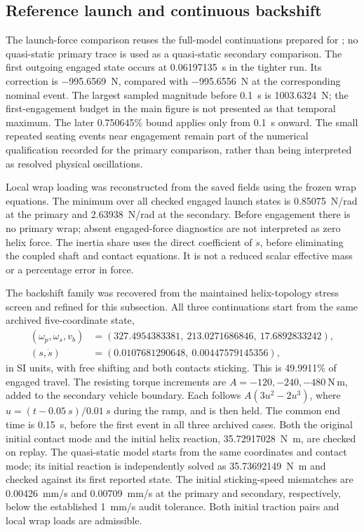 \documentclass[11pt]{report}
\numberwithin{equation}{section}
\begin{document}
\subsection{Reference launch and continuous backshift}

The launch-force comparison reuses the full-model continuations prepared for
; no quasi-static primary trace
is used as a quasi-static secondary comparison. The first outgoing engaged
state occurs at \SI{0.06197135}{s} in the tighter run. Its correction is
\SI{-995.6569}{N}, compared with \SI{-995.6556}{N} at the corresponding
nominal event. The largest sampled magnitude before \SI{0.1}{s} is
\SI{1003.6324}{N}; the first-engagement budget in the main figure is not
presented as that temporal maximum. The later \num{0.750645}\% bound
applies only from \SI{0.1}{s} onward. The small repeated seating events
near engagement remain part of the numerical qualification recorded for
the primary comparison, rather than being interpreted as resolved physical
oscillations.

Local wrap loading was reconstructed from the saved fields using the
frozen wrap equations. The minimum over all checked engaged launch states
is \SI{0.85075}{N/rad} at the primary and \SI{2.63938}{N/rad} at the
secondary. Before engagement there is no primary wrap; absent engaged-force
diagnostics are not interpreted as zero helix force. The inertia share
uses the direct coefficient of \(\ddot s\), before eliminating the
coupled shaft and contact equations. It is not a reduced scalar effective
mass or a percentage error in force.

The backshift family was recovered from the maintained helix-topology
stress screen and refined for this subsection. All three continuations
start from the same archived five-coordinate state,
\[
\begin{aligned}
 (\omega_p,\omega_s,v_b)
   &=(327.4954383381,\ 213.0271686846,\ 17.6892833242),\\
 (s,\dot s)&=(0.0107681290648,\ 0.00447579145356),
\end{aligned}
\]
in SI units, with free shifting and both contacts sticking. This is
\num{49.9911}\% of engaged travel. The resisting torque increments are
\(A=-120,-240,-480~\mathrm{N\,m}\), added to the secondary vehicle
boundary. Each follows \(A(3u^2-2u^3)\), where
\(u=(t-\SI{0.05}{s})/\SI{0.01}{s}\) during the ramp, and is then held.
The common end time is \SI{0.15}{s}, before the first event in all three
archived cases. Both the original initial contact mode and the initial
helix reaction, \SI{35.72917028}{N.m}, are checked on replay. The
quasi-static model starts from the same coordinates and contact mode;
its initial reaction is independently solved as \SI{35.73692149}{N.m}
and checked against its first reported state. The initial sticking-speed
mismatches are \SI{0.00426}{mm/s} and \SI{0.00709}{mm/s} at the primary
and secondary, respectively, below the established \SI{1}{mm/s} audit
tolerance. Both initial traction pairs and local wrap loads are admissible.
\end{document}
